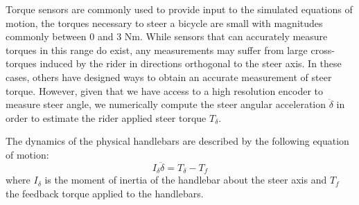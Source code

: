 \documentclass[11pt,a4paper,reqno]{amsart}
\begin{document}
Torque sensors are commonly used to provide input to the simulated equations of motion\cite{FIXME}, the torques
necessary to steer a bicycle are small with magnitudes commonly between 0 and 3 Nm\cite{moore2012}.
While sensors that can accurately measure torques in this range do exist, any measurements may suffer from large
cross-torques induced by the rider in directions orthogonal to the steer axis.
In these cases, others have designed ways to obtain an accurate measurement of steer torque\cite{moore2012}.
However, given that we have access to a high resolution encoder to measure steer angle, we numerically compute the steer
angular acceleration $ \ddot{\delta} $ in order to estimate the rider applied steer torque $ T_\delta $.

The dynamics of the physical handlebars are described by the following equation of motion:
\begin{equation}
    I_\delta \ddot{\delta} = T_\delta - T_f
\end{equation}
where $ I_\delta $ is the moment of inertia of the handlebar about the steer axis and $ T_f $ the feedback torque
applied to the handlebars.
\end{document}
